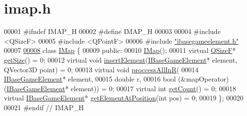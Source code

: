 \hypertarget{a00053_source}{}\section{imap.\+h}
\label{a00053_source}

\begin{DoxyCode}
00001 \textcolor{preprocessor}{#}\textcolor{preprocessor}{ifndef} \textcolor{preprocessor}{IMAP\_H}
00002 \textcolor{preprocessor}{#}\textcolor{preprocessor}{define} \textcolor{preprocessor}{IMAP\_H}
00003 
00004 \textcolor{preprocessor}{#}\textcolor{preprocessor}{include} \textcolor{preprocessor}{<}\textcolor{preprocessor}{QSizeF}\textcolor{preprocessor}{>}
00005 \textcolor{preprocessor}{#}\textcolor{preprocessor}{include} \textcolor{preprocessor}{<}\textcolor{preprocessor}{QPointF}\textcolor{preprocessor}{>}
00006 \textcolor{preprocessor}{#}\textcolor{preprocessor}{include} \hyperlink{a00047}{"ibasegameelement.h"}
00007 
\hyperlink{a00165}{00008} \textcolor{keyword}{class} \hyperlink{a00165}{IMap} \{
00009  \textcolor{keyword}{public}:
00010   \hyperlink{a00165_ac705a2e065b5c4604e43a44b488d798a}{IMap}();
00011   \textcolor{keyword}{virtual} \hyperlink{a00165_a183f2d7ba8ec154d0338e999f195d0c8}{QSizeF}* \hyperlink{a00165_a183f2d7ba8ec154d0338e999f195d0c8}{getSize}() = 0;
00012   \textcolor{keyword}{virtual} \textcolor{keywordtype}{void} \hyperlink{a00165_a2d44fb3d3798e08bebcd25ad5f1787f4}{insertElement}(\hyperlink{a00137_ae2be75da1a2a9edfabe993770e24654a}{IBaseGameElement}* element, QVector3D point) 
      = 0;
00013   \textcolor{keyword}{virtual} \textcolor{keywordtype}{void} \hyperlink{a00165_aa4feb51c5d024c99d4c57ccf5d2ff82d}{proccessAllInR}(
00014       \hyperlink{a00137_ae2be75da1a2a9edfabe993770e24654a}{IBaseGameElement}* element,
00015       \textcolor{keywordtype}{double} r,
00016       \textcolor{keywordtype}{bool} (&mapOperator)(\hyperlink{a00137_ae2be75da1a2a9edfabe993770e24654a}{IBaseGameElement}* element)) = 0;
00017   \textcolor{keyword}{virtual} \textcolor{keywordtype}{int} \hyperlink{a00165_a021e64b05ecb6558ed1d663676f82971}{getCount}() = 0;
00018   \textcolor{keyword}{virtual} \hyperlink{a00137_ae2be75da1a2a9edfabe993770e24654a}{IBaseGameElement}* \hyperlink{a00165_a9fce1fb4ad8fac181fbbce3ce31da0a0}{getElementAtPosition}(\textcolor{keywordtype}{int} pos) = 0;
00019 \};
00020 
00021 \textcolor{preprocessor}{#}\textcolor{preprocessor}{endif}  \textcolor{comment}{// IMAP\_H}
\end{DoxyCode}
